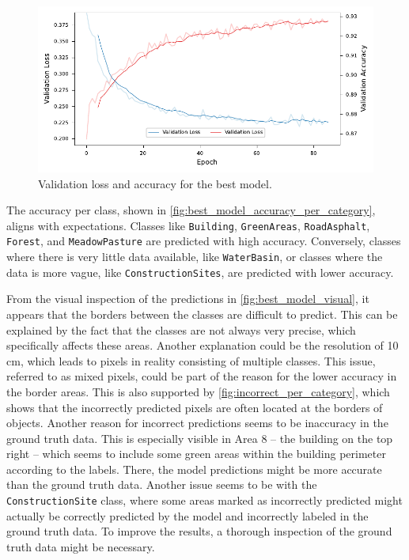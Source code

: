 \begin{figure}[H]
    \centering
    \captionsetup{width=0.8\linewidth}
    \includegraphics{figures/best_model_training_metrics.pdf}
    \caption{Validation loss and accuracy for the best model.}
    \label{fig:best_model_training_metrics}
\end{figure}

The accuracy per class, shown in \autoref{fig:best_model_accuracy_per_category},
aligns with expectations. Classes like \texttt{Building}, \texttt{GreenAreas}, \texttt{RoadAsphalt}, \texttt{Forest},
and \texttt{MeadowPasture} are predicted with high accuracy. Conversely, classes where there is
very little data available, like \texttt{WaterBasin}, or classes where the data is more vague,
like \texttt{ConstructionSites}, are predicted with lower accuracy.

From the visual inspection of the predictions in \autoref{fig:best_model_visual},  
it appears that the borders between the classes are difficult to predict. This can be  
explained by the fact that the classes are not always very precise, which specifically  
affects these areas. Another explanation could be the resolution of 10 cm,  
which leads to pixels in reality consisting of multiple classes. This issue, referred to  
as mixed pixels, could be part of the reason for the lower accuracy in the  
border areas. This is also supported by \autoref{fig:incorrect_per_category},  
which shows that the incorrectly predicted pixels are often located at the borders  
of objects. Another reason for incorrect predictions seems to be inaccuracy in the  
ground truth data. This is especially visible in Area 8 -- the building on the  
top right -- which seems to include some green areas within the building perimeter according to the labels.  
There, the model predictions might be more accurate than the ground truth data.  
Another issue seems to be with the \texttt{ConstructionSite} class, where some  
areas marked as incorrectly predicted might actually be correctly predicted by the model  
and incorrectly labeled in the ground truth data. To improve the results, a thorough  
inspection of the ground truth data might be necessary.

